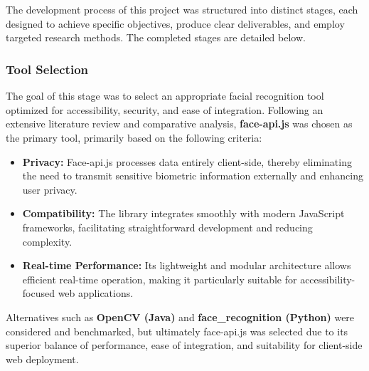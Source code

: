 
\chapter{}%
\label{ch:methodologie}

The development process of this project was structured into distinct stages, each designed to achieve specific objectives, produce clear deliverables, and employ targeted research methods. The completed stages are detailed below.

\subsection{Tool Selection}
The goal of this stage was to select an appropriate facial recognition tool optimized for accessibility, security, and ease of integration. Following an extensive literature review and comparative analysis, \textbf{face-api.js} was chosen as the primary tool, primarily based on the following criteria:
\begin{itemize}
\item \textbf{Privacy:} Face-api.js processes data entirely client-side, thereby eliminating the need to transmit sensitive biometric information externally and enhancing user privacy.
\item \textbf{Compatibility:} The library integrates smoothly with modern JavaScript frameworks, facilitating straightforward development and reducing complexity.
\item \textbf{Real-time Performance:} Its lightweight and modular architecture allows efficient real-time operation, making it particularly suitable for accessibility-focused web applications.
\end{itemize}

Alternatives such as \textbf{OpenCV (Java)} and \textbf{face\_recognition (Python)} were considered and benchmarked, but ultimately face-api.js was selected due to its superior balance of performance, ease of integration, and suitability for client-side web deployment.


